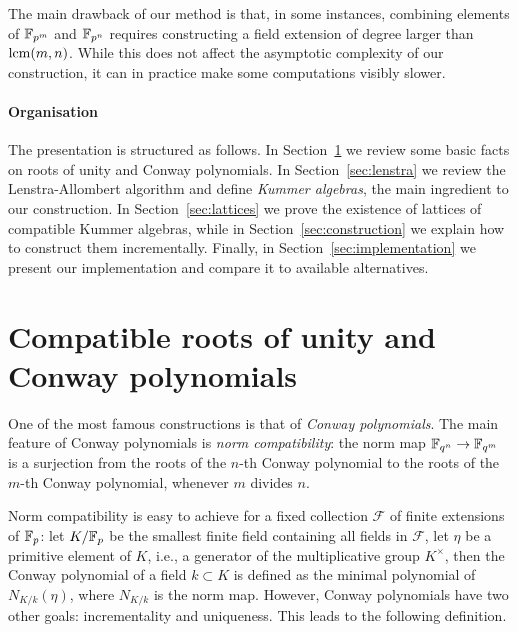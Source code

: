 \documentclass{sig-alternate}
\begin{document}
The main drawback of our method is that, in some instances, combining
elements of $\mathbb{F}_{p^m}$ and $\mathbb{F}_{p^n}$ requires constructing a field
extension of degree larger than $\operatorname{lcm}(m,n)$. %
While this does not affect the asymptotic complexity of our
construction, %
it can in practice make some computations visibly slower.


\paragraph{Organisation}
The presentation is structured as follows. %
In Section~\ref{sec:conway} we review some basic facts on roots of
unity and Conway polynomials. %
In Section~\ref{sec:lenstra} we review the Lenstra-Allombert algorithm
and define \emph{Kummer
  algebras}, %
the main ingredient to our construction. %
In Section~\ref{sec:lattices} we prove the existence of lattices of
compatible Kummer algebras, while in Section~\ref{sec:construction} we
explain how to construct them incrementally. %
Finally, in Section~\ref{sec:implementation} we present our
implementation and compare it to available alternatives.


\section{Compatible roots of unity and Conway polynomials}
\label{sec:conway}


One of the most famous constructions is that of \emph{Conway
  polynomials}. %
The main feature of Conway polynomials is \emph{norm compatibility}:
the norm map $\mathbb{F}_{q^n}\to\mathbb{F}_{q^m}$ is a surjection from the roots of the
$n$-th Conway polynomial to the roots of the $m$-th Conway polynomial,
whenever $m$ divides $n$. %

Norm compatibility is easy to achieve for a fixed collection
$\mathcal{F}$ of finite extensions of $\mathbb{F}_p$: let $K/\mathbb{F}_p$ be the
smallest finite field containing all fields in $\mathcal{F}$, let
$\eta$ be a primitive element of $K$, i.e., a generator of the
multiplicative group $K^\times$, then the Conway polynomial of a field
$k\subset K$ is defined as the minimal polynomial of $N_{K/k}(\eta)$,
where $N_{K/k}$ is the norm map. %
However, Conway polynomials have two other goals: incrementality and
uniqueness. %
This leads to the following definition.
\end{document}

